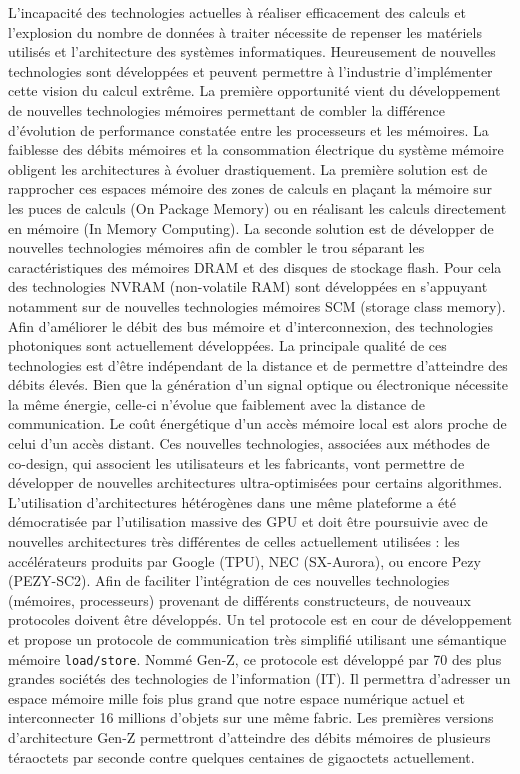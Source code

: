         L'incapacité des technologies actuelles à réaliser efficacement des calculs et l'explosion du nombre de données à traiter nécessite de repenser les matériels utilisés et l'architecture des systèmes informatiques. Heureusement de nouvelles technologies sont développées et peuvent permettre à l'industrie d'implémenter cette vision du calcul extrême.
        La première opportunité vient du développement de nouvelles technologies mémoires permettant de combler la différence d'évolution de performance constatée entre les processeurs et les mémoires. La faiblesse des débits mémoires et la consommation électrique du système mémoire obligent les architectures à évoluer drastiquement. La première solution est de rapprocher ces espaces mémoire des zones de calculs en plaçant la mémoire sur les puces de calculs (On Package Memory) ou en réalisant les calculs directement en mémoire (In Memory Computing).  La seconde solution est de développer de nouvelles technologies mémoires afin de combler le trou séparant les caractéristiques des mémoires DRAM et des disques de stockage flash. Pour cela des technologies NVRAM (non-volatile RAM) sont développées en s'appuyant notamment sur de nouvelles technologies mémoires SCM (storage class memory).
        Afin d'améliorer le débit des bus mémoire et d'interconnexion, des technologies photoniques sont actuellement développées. La principale qualité de ces technologies est d'être indépendant de la distance et de permettre d'atteindre des débits élevés. Bien que la génération d'un signal optique ou électronique nécessite la même énergie, celle-ci n'évolue que faiblement avec la distance de communication. Le coût énergétique d'un accès mémoire local est alors proche de celui d'un accès distant. 
        Ces nouvelles technologies, associées aux méthodes de co-design, qui associent les utilisateurs et les fabricants, vont permettre de développer de nouvelles architectures ultra-optimisées pour certains algorithmes.  L'utilisation d'architectures hétérogènes dans une même plateforme a été démocratisée par l'utilisation massive des GPU et doit être poursuivie avec de nouvelles architectures très différentes de celles actuellement utilisées : les accélérateurs produits par Google (TPU), NEC (SX-Aurora), ou encore Pezy (PEZY-SC2). 
        Afin de faciliter l'intégration de ces nouvelles technologies (mémoires, processeurs) provenant de différents constructeurs, de nouveaux protocoles doivent être développés. Un tel protocole est en cour de développement et propose un protocole de communication très simplifié utilisant une sémantique mémoire \verb=load/store=. Nommé Gen-Z, ce protocole est développé par 70 des plus grandes sociétés des technologies de l'information (IT). Il permettra d'adresser un espace mémoire mille fois plus grand que notre espace numérique actuel et interconnecter 16 millions d'objets sur une même fabric. Les premières versions d'architecture Gen-Z permettront d'atteindre des débits mémoires de plusieurs téraoctets par seconde contre quelques centaines de gigaoctets actuellement.

